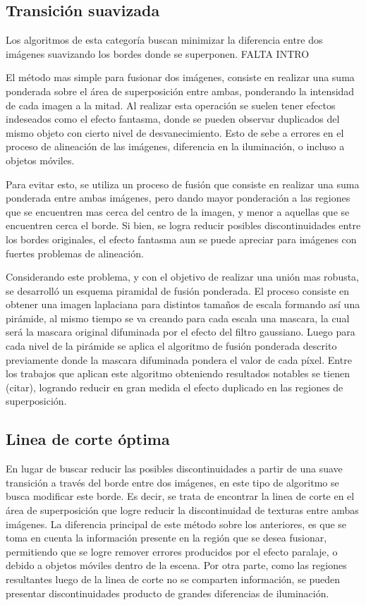 \subsection*{Transición suavizada}

Los algoritmos de esta categoría buscan minimizar la diferencia entre dos imágenes suavizando los bordes donde se superponen. FALTA INTRO

El método mas simple para fusionar dos imágenes, consiste en realizar una suma ponderada sobre el área de superposición entre ambas, ponderando la intensidad de cada imagen a la mitad. Al realizar esta operación se suelen tener efectos indeseados como el efecto fantasma, donde se pueden observar duplicados del mismo objeto con cierto nivel de desvanecimiento. Esto de sebe a errores en el proceso de alineación de las imágenes, diferencia en la iluminación, o incluso a objetos móviles. 

Para evitar esto, se utiliza un proceso de fusión que consiste en realizar una suma ponderada entre ambas imágenes, pero dando mayor ponderación a las regiones que se encuentren mas cerca del centro de la imagen, y menor a aquellas que se encuentren cerca el borde. Si bien, se logra reducir posibles discontinuidades entre los bordes originales, el efecto fantasma aun se puede apreciar para imágenes con fuertes problemas de alineación.

Considerando este problema, y con el objetivo de realizar una unión mas robusta, se desarrolló un esquema piramidal de fusión ponderada. El proceso consiste en obtener una imagen laplaciana para distintos tamaños de escala formando así una pirámide, al mismo tiempo se va creando para cada escala una mascara, la cual será la mascara original difuminada por el efecto del filtro gaussiano. Luego para cada nivel de la pirámide se aplica el algoritmo de fusión ponderada descrito previamente donde la mascara  difuminada pondera el valor de cada píxel. Entre los trabajos que aplican este algoritmo obteniendo resultados notables se tienen (citar), logrando reducir en gran medida el efecto duplicado en las regiones de superposición.

\subsection*{Linea de corte óptima}

En lugar de buscar reducir las posibles discontinuidades a partir de una suave transición a través del borde entre dos imágenes, en este tipo de algoritmo se busca modificar este borde. Es decir, se trata de encontrar la linea de corte en el área de superposición que logre reducir la discontinuidad de texturas entre ambas imágenes. La diferencia principal de este método sobre los anteriores, es que se toma en cuenta la información presente en la región que se desea fusionar, permitiendo que se logre remover errores producidos por el efecto paralaje, o debido a objetos móviles dentro de la escena. Por otra parte, como las regiones resultantes luego de la linea de corte no se comparten información, se pueden presentar discontinuidades producto de grandes diferencias de iluminación.


